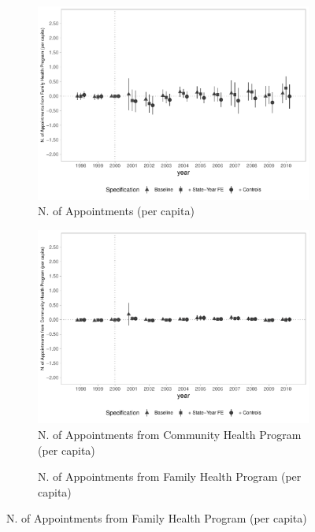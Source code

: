 \begin{figure}[h]
\begin{center}
\begin{subfigure}{0.32\textwidth}
        \centering
        \caption{\scriptsize N. of Appointments (per capita)}\label{fig:access2_g}
        \includegraphics[width=\textwidth]{plots/access/siab_cons_especif_pcapita_dist_ec29_baseline_dist_ec29_baseline_full.pdf}
    \end{subfigure}
    \begin{subfigure}{0.32\textwidth}
        \centering
        \caption{\scriptsize N. of Appointments from Community Health Program (per capita)}\label{fig:access2_h}
        \includegraphics[width=\textwidth]{plots/access/siab_cons_especif_pacs_pcapita_dist_ec29_baseline_dist_ec29_baseline_full.pdf}
    \end{subfigure}
    \begin{subfigure}{0.32\textwidth}
        \centering
        \caption{\scriptsize N. of Appointments from Family Health Program (per capita)}\label{fig:access2_i}

\end{subfigure}
\end{center}
\end{figure}
